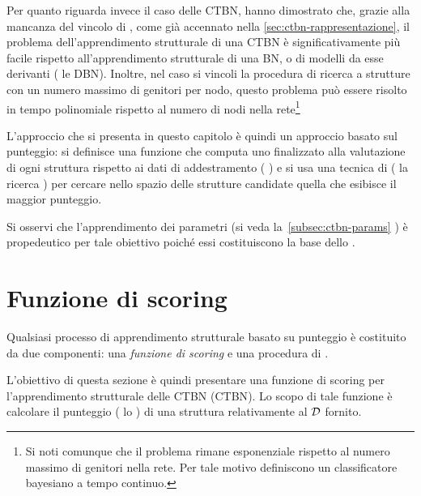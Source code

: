 Per quanto riguarda invece il caso delle \acs{CTBN}, \citet{Nodelman2002} hanno dimostrato che, grazie alla mancanza del vincolo di , come già accennato nella \autoref{sec:ctbn-rappresentazione}, il problema dell'apprendimento strutturale di una \acs{CTBN} è significativamente più facile rispetto all'apprendimento strutturale di una \acl{BN}, o di modelli da esse derivanti (\eg{} le \acf{DBN}). Inoltre, nel caso si vincoli la procedura di ricerca a strutture con un numero massimo di genitori per nodo, questo problema può essere risolto in tempo polinomiale rispetto al numero di nodi nella rete\footnote{Si noti comunque che il problema rimane esponenziale rispetto al numero massimo di genitori nella rete. Per tale motivo \citet{Stella2012} definiscono un classificatore bayesiano a tempo continuo.}

L'approccio che si presenta in questo capitolo è quindi un approccio basato sul punteggio: si definisce una funzione che computa uno \emph{} finalizzato alla valutazione di ogni struttura rispetto ai dati di addestramento (\ie{} \emph{}) e si usa una tecnica di  (\eg{} la ricerca \emph{\hc{}}) per cercare nello spazio delle strutture candidate quella che esibisce il maggior punteggio.

Si osservi che l'apprendimento dei parametri (si veda la~\autoref{subsec:ctbn-params} ) è propedeutico per tale obiettivo poiché essi costituiscono la base dello .

\section{Funzione di scoring}\label{sec:ctbn-structurallearning-score}
Qualsiasi processo di apprendimento strutturale basato su punteggio è costituito da due componenti: una \emph{funzione di scoring} e una procedura di .

L'obiettivo di questa sezione è quindi presentare una funzione di scoring per l'apprendimento strutturale delle \acl{CTBN} (\acs{CTBN}). Lo scopo di tale funzione è calcolare il punteggio (\ie{} lo ) di una struttura relativamente al \emph{} $\mathcal{D}$ fornito.

